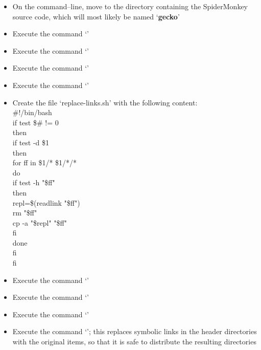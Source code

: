 \begin{itemize}
\item On the command--line, move to the directory containing the SpiderMonkey source code,
which will most likely be named `\textbf{gecko}'
\item Execute the command `'
\item Execute the command `'
\item Execute the command `'
\item Execute the command `'
\item Create the file `replace-links.sh' with the following content:\\
\codeBegin{}
\#!/bin/bash\\
if test \$\# != 0\\
then\\
\tS\tS{}if test -d \$1\\
\tS\tS{}then\\
\tS\tS\tS\tS{}for ff in \$1/* \$1/*/*\\
\tS\tS\tS\tS{}do\\
\tS\tS\tS\tS\tS\tS{}if test -h "\$ff"\\
\tS\tS\tS\tS\tS\tS{}then\\
\tS\tS\tS\tS\tS\tS\tS\tS{}repl=\$(readlink "\$ff")\\
\tS\tS\tS\tS\tS\tS\tS\tS{}rm "\$ff"\\
\tS\tS\tS\tS\tS\tS\tS\tS{}cp -a "\$repl" "\$ff"\\
\tS\tS\tS\tS\tS\tS{}fi\\
\tS\tS\tS\tS{}done\\
\tS\tS{}fi\\
fi\\
\codeEnd{}
\item Execute the command `'
\item Execute the command `'
\item Execute the command `'
\item Execute the command `';
this replaces symbolic links in the header directories with the original items, so that it
is safe to distribute the resulting directories
\end{itemize}
